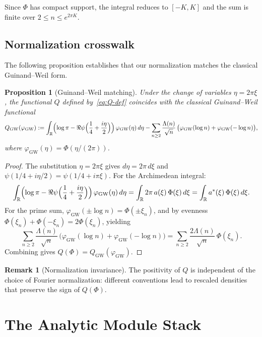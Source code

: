 \documentclass[11pt,a4paper]{article}
\newtheorem{proposition}[theorem]{Proposition}
\theoremstyle{definition}
\newtheorem{remark}[theorem]{Remark}
\newcommand{\RR}{\mathbb{R}}
\begin{document}
Since $\Phi$ has compact support, the integral reduces to $[-K,K]$ and the sum is finite over $2 \le n \le e^{2\pi K}$.

\subsection{Normalization crosswalk}

The following proposition establishes that our normalization matches the classical Guinand--Weil form.

\begin{proposition}[Guinand--Weil matching]\label{prop:GW-match}
Under the change of variables $\eta = 2\pi\xi$, the functional $Q$ defined by~\eqref{eq:Q-def} coincides with the classical Guinand--Weil functional
\[
Q_{\mathrm{GW}}(\varphi_{\mathrm{GW}}) := \int_{\RR} \Bigl(\log\pi - \Re\psi\Bigl(\frac{1}{4} + \frac{i\eta}{2}\Bigr)\Bigr)\,\varphi_{\mathrm{GW}}(\eta)\,d\eta - \sum_{n \ge 2} \frac{\Lambda(n)}{\sqrt{n}}\,\bigl(\varphi_{\mathrm{GW}}(\log n) + \varphi_{\mathrm{GW}}(-\log n)\bigr),
\]
where $\varphi_{\mathrm{GW}}(\eta) = \Phi(\eta/(2\pi))$.
\end{proposition}

\begin{proof}
The substitution $\eta = 2\pi\xi$ gives $d\eta = 2\pi\,d\xi$ and $\psi(1/4 + i\eta/2) = \psi(1/4 + i\pi\xi)$. For the Archimedean integral:
\[
\int_{\RR} \Bigl(\log\pi - \Re\psi\Bigl(\frac{1}{4} + \frac{i\eta}{2}\Bigr)\Bigr)\,\varphi_{\mathrm{GW}}(\eta)\,d\eta = \int_{\RR} 2\pi\,a(\xi)\,\Phi(\xi)\,d\xi = \int_{\RR} a^*(\xi)\,\Phi(\xi)\,d\xi.
\]
For the prime sum, $\varphi_{\mathrm{GW}}(\pm\log n) = \Phi(\pm\xi_n)$, and by evenness $\Phi(\xi_n) + \Phi(-\xi_n) = 2\Phi(\xi_n)$, yielding
\[
\sum_{n \ge 2} \frac{\Lambda(n)}{\sqrt{n}}\,\bigl(\varphi_{\mathrm{GW}}(\log n) + \varphi_{\mathrm{GW}}(-\log n)\bigr) = \sum_{n \ge 2} \frac{2\Lambda(n)}{\sqrt{n}}\,\Phi(\xi_n).
\]
Combining gives $Q(\Phi) = Q_{\mathrm{GW}}(\varphi_{\mathrm{GW}})$.
\end{proof}

\begin{remark}[Normalization invariance]
The positivity of $Q$ is independent of the choice of Fourier normalization: different conventions lead to rescaled densities that preserve the sign of $Q(\Phi)$.
\end{remark}

\section{The Analytic Module Stack}\label{sec:modules}
\end{document}
